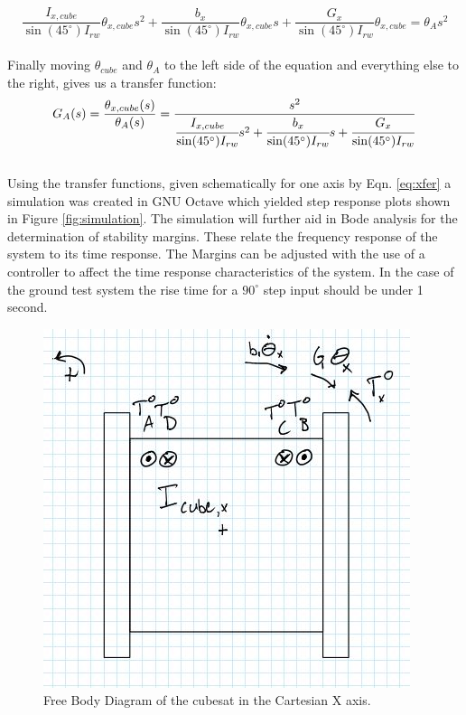 \documentclass[]{aiaa-tc}%
\begin{document}
\[
\frac{I_{x,cube}}{\sin(45^{\circ}) I_{rw}} \theta_{x,cube} s^2 +
\frac{b_x}{\sin(45^{\circ}) I_{rw}} \theta_{x,cube} s +
\frac{G_x}{\sin(45^{\circ}) I_{rw}} \theta_{x,cube} = \theta_A s^2
\]\\
	
Finally moving $\theta_{cube}$ and $\theta_A$ to the left side of the equation and everything else to the right, gives us a transfer function:\\

\begin{equation}
\label{eq:xfer}
G_A(s)=\frac{\theta_{x,cube}(s)}{\theta_A(s)}=\frac{s^2}{\cfrac{I_{x,cube}}{\sin(45^{\circ}) I_{rw}}s^2 + \cfrac{b_x}{\sin(45^{\circ}) I_{rw}}s + \cfrac{G_x}{\sin(45^{\circ}) I_{rw}}}
\end{equation}\\
	
Using the transfer functions, given schematically for one axis by Eqn. \ref{eq:xfer} a simulation was created in GNU Octave which yielded step response plots shown in Figure \ref{fig:simulation}. The simulation will further aid in Bode analysis for the determination of stability margins. These relate the frequency response of the system to its time response. The Margins can be adjusted with the use of a controller to affect the time response characteristics of the system. In the case of the ground test system the rise time for a $90^{\circ}$ step input should be under 1 second. 
\begin{figure}[h!]
  \centering
  \includegraphics[width=0.35\linewidth]{equations/Cube_FBD.JPG}
  \caption{Free Body Diagram of the cubesat in the Cartesian X axis.}
  \label{fig:FBD}
\end{figure}
\end{document}
